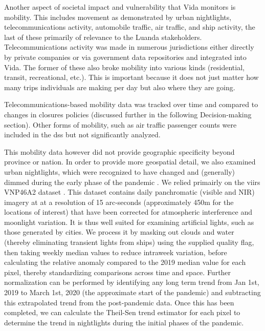 Another aspect of societal impact and vulnerability that Vida monitors is mobility. This includes movement as demonstrated by urban nightlights, telecommunications activity, automobile traffic, air traffic, and ship activity, the last of these primarily of relevance to the Luanda stakeholders. Telecommunications activity was made in numerous jurisdictions either directly by private companies \cite{googleCOVID19CommunityMobility} or via government data repositories \cite{ministeriodecienciatecnologiaconocimientoeinnovacionDatosCOVID192021} and integrated into Vida. The former of these also broke mobility into various kinds (residential, transit, recreational, etc.). This is important because it does not just matter how many trips individuals are making per day but also where they are going.

Telecommunications-based mobility data was tracked over time and compared to changes in closures policies (discussed further in the following Decision-making section). Other forms of mobility, such as air traffic passenger counts were included in the \ac{dss} but not significantly analyzed.

This mobility data however did not provide geographic specificity beyond province or nation. In order to provide more geospatial detail, we also examined urban nightlights, which were recognized to have changed and (generally) dimmed during the early phase of the pandemic \cite{elvidgeDimmingLightsChina2020}. We relied primairly on the \ac{viirs} VNP46A2 dataset \cite{romanNASABlackMarble2018}. This dataset contains daily panchromatic (visible and NIR) imagery at at a resolution of 15 arc-seconds (approximately 450m for the locations of interest) that have been corrected for atmospheric interference and moonlight variation. It is thus well suited for examining artificial lights, such as those generated by cities. We process it by masking out clouds and water (thereby eliminating transient lights from ships) using the supplied quality flag, then taking weekly median values to reduce intraweek variation, before calculating the relative anomaly compared to the 2019 median value for each pixel, thereby standardizing comparisons across time and space. Further normalization can be performed by identifying any long term trend from Jan 1st, 2019 to March 1st, 2020 (the approximate start of the pandemic) and subtracting this extrapolated trend from the post-pandemic data. Once this has been completed, we can calculate the Theil-Sen trend estimator for each pixel to determine the trend in nightlights during the initial phases of the pandemic.

